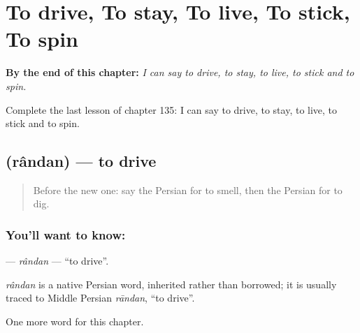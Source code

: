 
\chapter{To drive, To stay, To live, To stick, To spin}
\label{ch:fa-to-drive-to-stay-to-live-to-stick-to-spin}

\begin{chapteropening}
\textbf{By the end of this chapter:} \emph{I can say to drive, to stay, to live, to stick and to spin.}

Complete the last lesson of chapter 135: I can say to drive, to stay, to live, to stick and to spin.
\end{chapteropening}

\section[\texorpdfstring{\fa{راندن} (rândan)}{راندن (rândan)}]{ (rândan) — to drive}

\label{lesson:FA-C135-randan}



\begin{quote}
Before the new one: say the Persian for to smell, then the Persian for to dig.
\end{quote}

\subsection*{You'll want to know: }
\textbf{} — \emph{rândan} — \textquotedblleft{}to drive\textquotedblright{}.

\begin{cousinweb}
\emph{rândan} is a native Persian word, inherited rather than borrowed; it is usually traced to Middle Persian \emph{rāndan}, \textquotedblleft{}to drive\textquotedblright{}.
\end{cousinweb}

\begin{grammarlens}[title={What you've built}]
One more word for this chapter.
\end{grammarlens}

